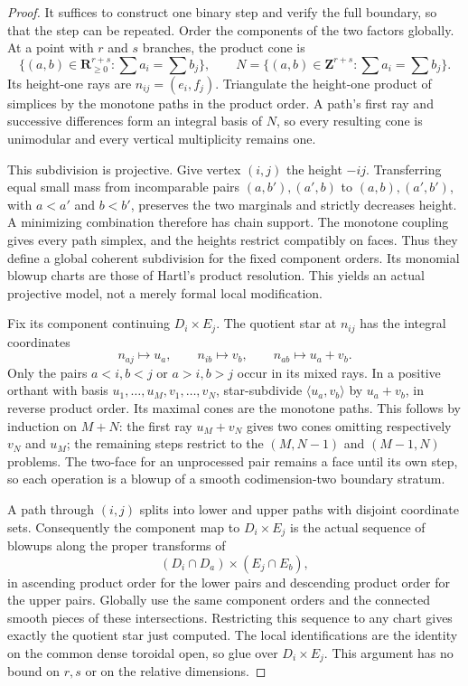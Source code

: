 \begin{proof}
It suffices to construct one binary step and verify the full
boundary, so that the step can be repeated.  Order the components
of the two factors globally.  At a point with $r$ and $s$ branches,
the product cone is
\[
 \{(a,b)\in\mathbf R_{\ge0}^{r+s}:\sum a_i=\sum b_j\},
 \qquad N=\{(a,b)\in\mathbf Z^{r+s}:\sum a_i=\sum b_j\}.
 \tag{AT20.6}\label{r20at:cone}
\]
Its height-one rays are $n_{ij}=(e_i,f_j)$.  Triangulate the
height-one product of simplices by the monotone paths in the
product order.  A path's first ray and successive differences
form an integral basis of $N$, so every resulting cone is
unimodular and every vertical multiplicity remains one.

This subdivision is projective.  Give vertex $(i,j)$ the height
$-ij$.  Transferring equal small mass from incomparable pairs
$(a,b'),(a',b)$ to $(a,b),(a',b')$, with $a<a'$ and $b<b'$,
preserves the two marginals and strictly decreases height.
A minimizing combination therefore has chain support.  The
monotone coupling gives every path simplex, and the heights
restrict compatibly on faces.  Thus they define a global coherent
subdivision for the fixed component orders.  Its monomial blowup
charts are those of Hartl's product resolution.  This yields an
actual projective model, not a merely formal local modification.

Fix its component continuing $D_i\times E_j$.  The quotient
star at $n_{ij}$ has the integral coordinates
\[
 n_{aj}\mapsto u_a,\qquad n_{ib}\mapsto v_b,\qquad
 n_{ab}\mapsto u_a+v_b.
 \tag{AT20.7}\label{r20at:star}
\]
Only the pairs $a<i,b<j$ or $a>i,b>j$ occur in its mixed rays.
In a positive orthant with basis $u_1,\ldots,u_M,v_1,\ldots,v_N$,
star-subdivide $\langle u_a,v_b\rangle$ by $u_a+v_b$, in
reverse product order.  Its maximal cones are the monotone
paths.  This follows by induction on $M+N$: the first ray
$u_M+v_N$ gives two cones omitting respectively $v_N$ and $u_M$;
the remaining steps restrict to the $(M,N-1)$ and $(M-1,N)$
problems.  The two-face for an unprocessed pair remains a face
until its own step, so each operation is a blowup of a smooth
codimension-two boundary stratum.

A path through $(i,j)$ splits into lower and upper paths with
disjoint coordinate sets.  Consequently the component map to
$D_i\times E_j$ is the actual sequence of blowups along the
proper transforms of
\[
           (D_i\cap D_a)\times(E_j\cap E_b),
 \tag{AT20.8}\label{r20at:centers}
\]
in ascending product order for the lower pairs and descending
product order for the upper pairs.  Globally use the same component
orders and the connected smooth pieces of these intersections.
Restricting this sequence to any chart gives exactly the quotient
star just computed.  The local identifications are the identity
on the common dense toroidal open, so glue over $D_i\times E_j$.
This argument has no bound on $r,s$ or on the relative dimensions.


\end{proof}
